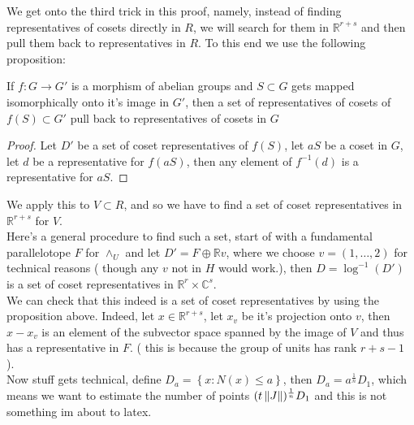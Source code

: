 \documentclass[../main.tex]{subfiles}
\begin{document}
We get onto the third trick in this proof, namely, instead of finding representatives of cosets directly in $R$, we will search for them in $\mathbb{R}^{r+s}$ and then pull them back to representatives in $R$. To this end we use the following proposition:
\begin{propo}
If $f:G \to G'$ is a morphism of abelian groups and $S \subset G $ gets mapped isomorphically onto it's image in $G'$, then a set of representatives of cosets of $f( S) \subset G'$ pull back to representatives of cosets in $G$ 
\end{propo}
\begin{proof}
Let $D'$ be a set of coset representatives of $f( S) $, let $aS$ be a coset in $G$, let $d$ be a representative for $f( aS) $, then any element of $f^{-1}( d) $ is a representative for $aS$.
\end{proof}
We apply this to $V \subset R$, and so we have to find a set of coset representatives in $ \mathbb{R}^{r+s}$ for $V$.\\
Here's a general procedure to find such a set, start of with a fundamental parallelotope $F$ for $\wedge_U$ and let $D'= F \oplus \mathbb{R}v$, where we choose $v= ( 1,\ldots, 2) $ for technical reasons ( though any $v$ not in $H$ would work.), then $D = \log ^{-1}( D') $ is a set of coset representatives in $ \mathbb{R}^{r} \times \mathbb{C}^{s}$.\\
We can check that this indeed is a set of coset representatives by using the proposition above.
Indeed, let $x \in \mathbb{R}^{r+s}$, let $x_v$ be it's projection onto $v$, then $x-x_v$ is an element of the subvector space spanned by the image of $V$ and thus has a representative in $F$. ( this is because the group of units has rank $r+s -1$ ).\\


Now stuff gets technical, define $D_a = \left\{ x : N( x) \leq a \right\} $, then $D_a = a^{\frac{1}{n}} D_1$, which means we want to estimate the number of points $ ( t \left\lVert J\right\rVert)^{\frac{1}{n}} D_1$ and this is not something im about to latex.
\end{document}
